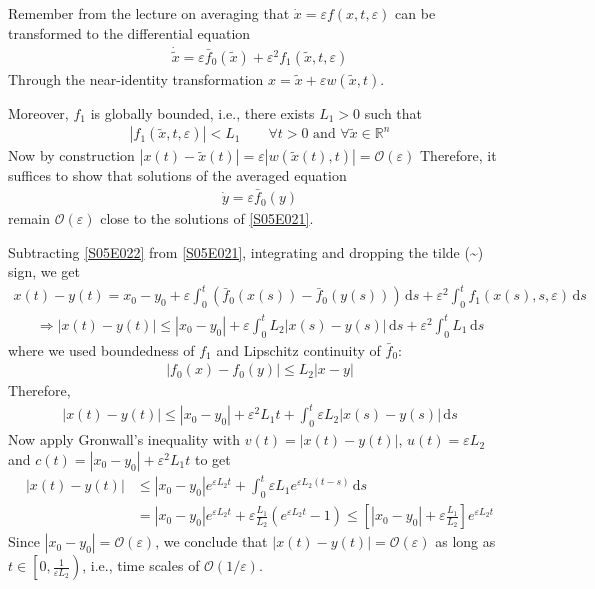 \begin{solution}[6.1]
Remember from the lecture on averaging that $\dot{x} = \varepsilon f(x,t, \varepsilon)$ can be transformed to the differential equation
\begin{align}\label{S05E021}
	\dot{\tilde{x}} = \varepsilon \bar{f}_0(\tilde{x}) + \varepsilon^2f_1(\tilde{x},t,\varepsilon)
\end{align}
Through the near-identity transformation $x = \tilde{x} + \varepsilon w(\tilde{x},t)$.

Moreover, $f_1$ is globally bounded, i.e., there exists $L_1 > 0$ such that
\begin{align}
	|f_1(\tilde{x},t,\varepsilon)| < L_1 \qquad \forall t > 0 \text{ and } \forall \tilde{x}\in \mathbb{R}^n
\end{align}
Now by construction $|x(t) - \tilde{x}(t)| = \varepsilon|w(\tilde{x}(t),t)| = \mathcal{O}(\varepsilon)$
Therefore, it suffices to show that solutions of the averaged equation
\begin{align}\label{S05E022}
	\dot{y} = \varepsilon \bar{f}_0(y)
\end{align}
remain $\mathcal{O}(\varepsilon)$ close to the solutions of \eqref{S05E021}.

Subtracting \eqref{S05E022} from \eqref{S05E021}, integrating and dropping the tilde (\textasciitilde) sign, we get 
\begin{align}
	x(t) - y(t) = x_0 - y_0 + \varepsilon \int_0^t \left( \bar{f}_0(x(s)) - \bar{f}_0(y(s)) \right) \, \text{d}s + \varepsilon^2 \int_0^t f_1(x(s),s,\varepsilon) \, \text{d}s
\end{align}
\begin{align}
	\Longrightarrow |x(t) - y(t)| \leq |x_0 - y_0| + \varepsilon \int_0^t L_2|x(s) - y(s)|\,\text{d}s + \varepsilon^2 \int_0^t L_1 \,\text{d}s
\end{align}
where we used boundedness of $f_1$ and Lipschitz continuity of $\bar{f}_0$:
\begin{align}
	|f_0(x) - f_0(y)| \leq L_2 |x - y|
\end{align}
Therefore,
\begin{align}\label{S05E023}
	|x(t) - y(t)| \leq |x_0 - y_0| + \varepsilon^2 L_1t + \int_0^t \varepsilon L_2 |x(s) - y(s)|\,\text{d}s
\end{align}
Now apply Gronwall's inequality with $v(t) = |x(t) - y(t)|$, $u(t) = \varepsilon L_2$ and $c(t) = |x_0 - y_0| + \varepsilon^2 L_1t$ to get
\begin{align}
	|x(t) - y(t)| &\leq |x_0 - y_0|e^{\varepsilon L_2 t} + \int_0^t \varepsilon L_1 e^{\varepsilon L_2 (t-s)}\,\text{d}s \\
	&= |x_0 - y_0|e^{\varepsilon L_2 t} + \varepsilon \frac{L_1}{L_2} \left( e^{\varepsilon L_2 t} -1 \right) \leq \left[ |x_0 - y_0| + \varepsilon \frac{L_1}{L_2} \right] e^{\varepsilon L_2 t}
\end{align}
Since $|x_0 - y_0| = \mathcal{O}(\varepsilon)$, we conclude that $|x(t) - y(t)|= \mathcal{O}(\varepsilon)$ as long as $t\in \left[0,\frac{1}{\varepsilon L_2}\right)$, i.e., time scales of $\mathcal{O}(1/\varepsilon)$.
\end{solution}


